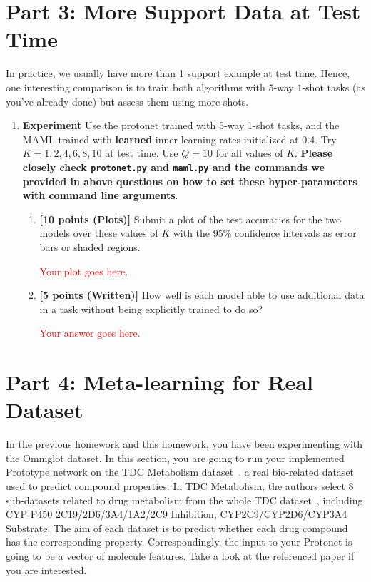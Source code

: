 \documentclass[12pt]{article}
\begin{document}
\newpage
\section*{Part 3: More Support Data at Test Time}

In practice, we usually have more than 1 support example at test time. Hence, one interesting comparison is to train both algorithms with $5$-way $1$-shot tasks (as you've already done) but assess them using more shots.

\begin{enumerate}
    \item \textbf{Experiment} Use the protonet trained with 5-way 1-shot tasks, and the MAML trained with \textbf{learned} inner learning rates initialized at 0.4. Try $K = 1, 2, 4, 6, 8, 10$ at test time. Use $Q = 10$ for all values of $K$. \textbf{Please closely check \texttt{protonet.py} and \texttt{maml.py} and the commands we provided in above questions on how to set these hyper-parameters with command line arguments}.
    
    \begin{enumerate}
        \item \textbf{[10 points (Plots)]} Submit a plot of the test accuracies for the two models over these values of $K$ with the 95\% confidence intervals as error bars or shaded regions. 

        \textcolor{red}{Your plot goes here.}

        
        \item \textbf{[5 points (Written)]} How well is each model able to use additional data in a task without being explicitly trained to do so?

        \textcolor{red}{Your answer goes here.}

    \end{enumerate}
\end{enumerate}

\section*{Part 4: Meta-learning for Real Dataset}
 In the previous homework and this homework, you have been experimenting with the Omniglot dataset. In this section, you are going to run your implemented Prototype network on the TDC Metabolism dataset~\cite{yao2021meta}, a real bio-related dataset used to predict compound properties. In TDC Metabolism, the authors select 8 sub-datasets related to drug metabolism from the
whole TDC dataset~\cite{huang2021therapeutics}, including CYP P450 2C19/2D6/3A4/1A2/2C9 Inhibition, CYP2C9/CYP2D6/CYP3A4 Substrate. The aim of each dataset is to predict whether each drug compound has the corresponding property. Correspondingly, the input to your Protonet is going to be a vector of molecule features. Take a look at the referenced paper if you are interested.
\end{document}
